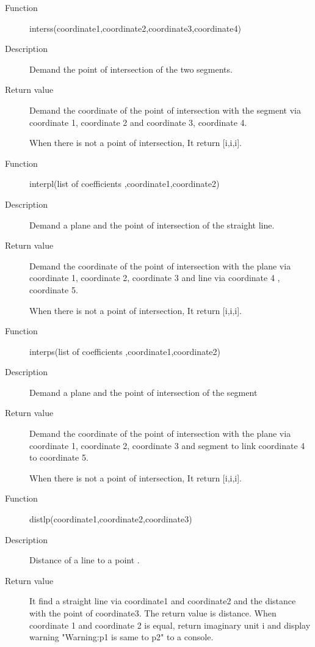 \documentclass[papersize,a4paper,12pt]{article}
\begin{document}
\begin{description}
\vspace{\baselineskip}

\hypertarget{interss}{}
\item[Function] interss(coordinate1,coordinate2,coordinate3,coordinate4)
\item[Description] Demand the point of intersection of the two segments.
\item[Return value]Demand the coordinate of the point of intersection with the segment via coordinate 1, coordinate 2 and coordinate 3, coordinate 4.

 When there is not a point of intersection, It return [i,i,i].

\vspace{\baselineskip}
\hypertarget{interpl}{}
\item[Function]interpl(list of coefficients ,coordinate1,coordinate2)
\item[Description] Demand a plane and the point of intersection of the straight line.
\item[Return value] Demand the coordinate of the point of intersection with the plane via coordinate 1, coordinate 2, coordinate 3  and line via coordinate 4 , coordinate 5.

 When there is not a point of intersection, It return [i,i,i].
 
\vspace{\baselineskip}
\hypertarget{interps}{}
\item[Function] interps(list of coefficients ,coordinate1,coordinate2)
\item[Description] Demand a plane and the point of intersection of the segment
\item[Return value]  Demand the coordinate of the point of intersection with the plane via coordinate 1, coordinate 2, coordinate 3  and segment to link coordinate 4 to coordinate 5.

 When there is not a point of intersection, It return [i,i,i].

\hypertarget{distlp}{}
\item[Function] distlp(coordinate1,coordinate2,coordinate3)
\item[Description] Distance of a line to a point .
\item[Return value] It find a straight line via coordinate1 and coordinate2 and the distance with the point of coordinate3. The return value is distance. When coordinate 1 and coordinate 2 is equal, return imaginary unit i and display warning "Warning:p1 is same to p2" to a console.


\end{description}
\end{document}
